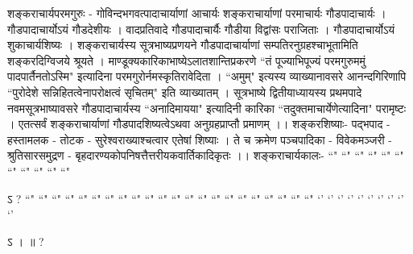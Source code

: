 शङ्कराचार्यपरमगुरुः -
गोविन्दभगवत्पादाचार्याणां आचार्यः शङ्कराचार्याणां परमाचार्यः गौडपादाचार्यः । गौडपादाचार्योऽयं गौडदेशीयः । वादप्रतिवादे गौडपादाचार्यैः गौडीया विद्वांसः पराजिताः । गौडपादाचार्योऽयं शुकाचार्यशिष्यः । शङ्कराचार्यस्य सूत्रभाष्यप्रणयने गौडपादाचार्याणां सम्पतिरनुग्रहश्चाभूतामिति शङ्करदिग्विजये श्रूयते । माण्डूक्यकारिकाभाष्येऽलातशान्तिप्रकरणे ``तं पूज्याभिपूज्यं परमगुरुममुं पादपार्तैनतोऽस्मि" इत्यादिना परमगुरोर्नमस्कृतिरावेदिता । ``अमुम्" इत्यस्य व्याख्यानावसरे आनन्दगिरिणापि ``पुरोदेशे सन्निहितत्वेनापरोक्षत्वं सृचितम्" इति व्याख्यातम् । सूत्रभाष्ये द्वितीयाध्यायस्य प्रथमपादे नवमसूत्रभाष्यावसरे गौडपादाचार्यस्य ``अनादिमायया" इत्यादिनी कारिका ``तदुक्तमाचार्येणेत्यादिना" परामृष्टः । एतत्सर्वं शङ्कराचार्याणां गौडपादशिष्यत्वेऽथवा अनुग्रहप्राप्तौ प्रमाणम् ।।
शङ्करशिष्याः-
पद्भपाद - हस्तामलक - तोटक - सुरेश्वराख्याश्चत्वार एतेषां शिष्याः । ते च क्रमेण पञ्चपादिका - विवेकमञ्जरी - श्रुतिसारसमुद्रण - बृहदारण्यकोपनिषत्तैत्तरीयकवार्तिकादिकृतः ।।
शङ्कराचार्यकालः- 
 ``" ``" ``" ``" ``" ``" ``" ``" ``" ``" ``" 

ऽ  ?
``" ``" ``" ``" ``" ``" ``" ``" ``" ``" ``" ``" ``" ``" ``" ``" ``" ``" ``" ``" ``" ``"
`' `' `' `' `' `' `' `' `' `' 

ऽ  ।   ॥ ?

